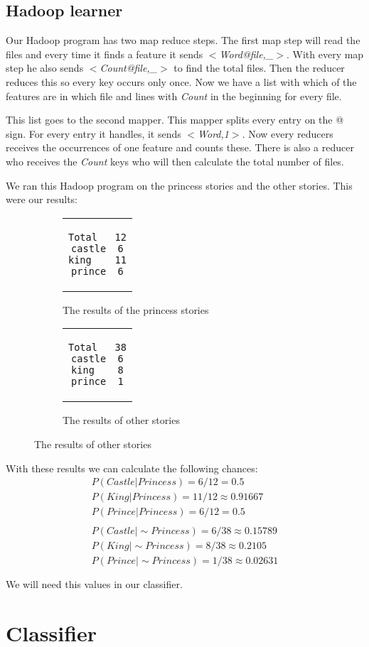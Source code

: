 \documentclass{article}
\begin{document}
\subsection{Hadoop learner}
Our Hadoop program has two map reduce steps. The first map step will read the files and every time it finds a feature it sends \textit{$<$Word@file,\_$>$}. With every map step he also sends \textit{$<$Count@file,\_$>$} to find the total files. Then the reducer reduces this so every key occurs only once. Now we have a list with which of the features are in which file and lines with \textit{Count} in the beginning for every file.\par
This list goes to the second mapper. This mapper splits every entry on the @ sign. For every entry it handles, it sends \textit{$<$Word,1$>$}. Now every reducers receives the occurrences of one feature and counts these. There is also a reducer who receives the \textit{Count} keys who will then calculate the total number of files.\par
We ran this Hadoop program on the princess stories and the other stories. This were our results:
\begin{figure}[!ht]
\centering
\begin{subfigure}{.5\textwidth}
\centering
\begin{tabular}{c}
\begin{lstlisting}
Total	12
castle	6
king 	11
prince	6
\end{lstlisting}
\end{tabular}
\label{fig:results_princes}
\caption{The results of the princess stories}
\end{subfigure}
\begin{subfigure}{.4\textwidth}
\centering
\begin{tabular}{c}
\begin{lstlisting}
Total	38
castle	6
king	8
prince	1
\end{lstlisting}
\end{tabular}
\label{fig:results_other}
\caption{The results of other stories}
\end{subfigure}
\end{figure}
With these results we can calculate the following chances:
\begin{gather*}
P(Castle | Princess) = 6/12 = 0.5\\
P(King | Princess) = 11/12 \approx 0.91667\\
P(Prince | Princess) = 6/12 = 0.5\\ \\
P(Castle | \sim Princess) = 6/38 \approx 0.15789\\
P(King | \sim Princess) = 8/38 \approx 0.2105\\
P(Prince | \sim Princess) = 1/38 \approx 0.02631\\ \\
\end{gather*}
We will need this values in our classifier.
\section{Classifier}
\end{document}
